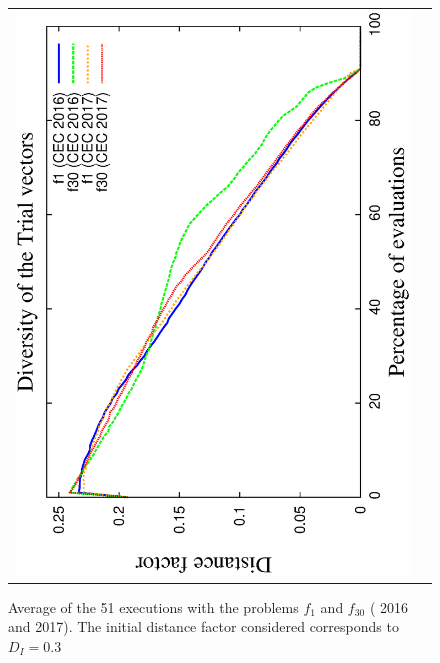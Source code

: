 \begin{figure}[t]
\begin{tabular}{cc}
   \includegraphics[scale=0.23, angle=-90]{img/Diversity_Trial.eps} 
\end{tabular}
\caption{Average \DCN{} of the 51 executions with the problems $f_1$ and $f_{30}$ (\CEC{} 2016 and \CEC{} 2017). The initial distance factor considered corresponds to $D_I=0.3$}
\label{fig:diversity}
\end{figure}






